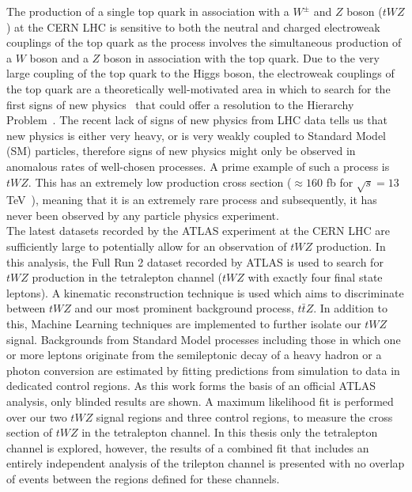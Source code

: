 The production of a single top quark in association with a $W^{\pm}$ and $Z$ boson ($tWZ$) at the CERN LHC is sensitive to both the neutral and charged electroweak couplings of the top quark as the process involves the simultaneous production of a $W$ boson and a $Z$ boson in association with the top quark. Due to the very large coupling of the top quark to the Higgs boson, the electroweak couplings of the top quark are a theoretically well-motivated area in which to search for the first signs of new physics~\cite{TopQuarkCouplings-searchNewPhysics, top-a-tool-for-disc} that could offer a resolution to the Hierarchy Problem~\cite{hierarchy-problem-paper, Burdman_2015}. The recent lack of signs of new physics from LHC data tells us that new physics is either very heavy, or is very weakly coupled to Standard Model (SM) particles, therefore signs of new physics might only be observed in anomalous rates of well-chosen processes. A prime example of such a process is $tWZ$. This has an extremely low production cross section ($\approx 160$ fb for $\sqrt{s}=13$ TeV~\cite{twz-theory-paper}), meaning that it is an extremely rare process and subsequently, it has never been observed by any particle physics experiment.\\

\noindent
The latest datasets recorded by the ATLAS experiment at the CERN LHC are sufficiently large to potentially allow for an observation of $tWZ$ production. In this analysis, the Full Run 2 dataset recorded by ATLAS is used to search for $tWZ$ production in the tetralepton channel ($tWZ$ with exactly four final state leptons). A kinematic reconstruction technique is used which aims to discriminate between $tWZ$ and our most prominent background process, $t\bar{t}Z$. In addition to this, Machine Learning techniques are implemented to further isolate our $tWZ$ signal. Backgrounds from Standard Model processes including those in which one or more leptons originate from the semileptonic decay of a heavy hadron or a photon conversion are estimated by fitting predictions from simulation to data in dedicated control regions. As this work forms the basis of an official ATLAS analysis, only blinded results are shown. A maximum likelihood fit is performed over our two $tWZ$ signal regions and three control regions, to measure the cross section of $tWZ$ in the tetralepton channel. In this thesis only the tetralepton channel is explored, however, the results of a combined fit that includes an entirely independent analysis of the trilepton channel is presented with no overlap of events between the regions defined for these channels. 
